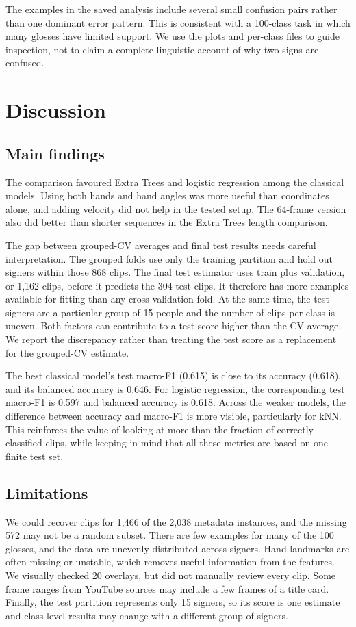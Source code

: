 \documentclass[12pt,a4paper,oneside]{report}
\begin{document}
The examples in the saved analysis include several small confusion pairs rather than one dominant error pattern. This is consistent with a 100-class task in which many glosses have limited support. We use the plots and per-class files to guide inspection, not to claim a complete linguistic account of why two signs are confused.

\chapter{Discussion}
\section{Main findings}
The comparison favoured Extra Trees and logistic regression among the classical models. Using both hands and hand angles was more useful than coordinates alone, and adding velocity did not help in the tested setup. The 64-frame version also did better than shorter sequences in the Extra Trees length comparison.

The gap between grouped-CV averages and final test results needs careful interpretation. The grouped folds use only the training partition and hold out signers within those 868 clips. The final test estimator uses train plus validation, or 1,162 clips, before it predicts the 304 test clips. It therefore has more examples available for fitting than any cross-validation fold. At the same time, the test signers are a particular group of 15 people and the number of clips per class is uneven. Both factors can contribute to a test score higher than the CV average. We report the discrepancy rather than treating the test score as a replacement for the grouped-CV estimate.

The best classical model's test macro-F1 (0.615) is close to its accuracy (0.618), and its balanced accuracy is 0.646. For logistic regression, the corresponding test macro-F1 is 0.597 and balanced accuracy is 0.618. Across the weaker models, the difference between accuracy and macro-F1 is more visible, particularly for kNN. This reinforces the value of looking at more than the fraction of correctly classified clips, while keeping in mind that all these metrics are based on one finite test set.

\section{Limitations}
We could recover clips for 1,466 of the 2,038 metadata instances, and the missing 572 may not be a random subset. There are few examples for many of the 100 glosses, and the data are unevenly distributed across signers. Hand landmarks are often missing or unstable, which removes useful information from the features. We visually checked 20 overlays, but did not manually review every clip. Some frame ranges from YouTube sources may include a few frames of a title card. Finally, the test partition represents only 15 signers, so its score is one estimate and class-level results may change with a different group of signers.
\end{document}
